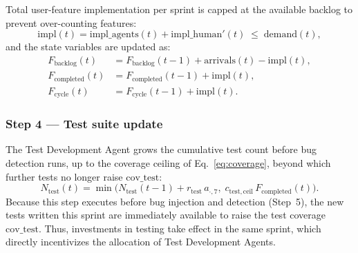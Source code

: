 \documentclass[smallextended]{svjour3}       %
\begin{document}
Total user-feature implementation per sprint is capped at the available backlog to
prevent over-counting features:
\begin{equation}
  \mathrm{impl}(t) = \mathrm{impl\_agents}(t) + \mathrm{impl\_human}'(t)
    \;\leq\; \mathrm{demand}(t),
  \label{eq:impl}
\end{equation}
and the state variables are updated as:
\begin{align}
  F_\mathrm{backlog}(t)   &= F_\mathrm{backlog}(t-1) + \mathrm{arrivals}(t) - \mathrm{impl}(t),
    \label{eq:backlog_update} \\
  F_\mathrm{completed}(t) &= F_\mathrm{completed}(t-1) + \mathrm{impl}(t),
    \label{eq:completed_update} \\
  F_\mathrm{cycle}(t) &= F_\mathrm{cycle}(t-1) + \mathrm{impl}(t).
    \label{eq:cycle_update}
\end{align}

\subsubsection*{Step 4 --- Test suite update}
The Test Development Agent grows the
cumulative test count before bug detection runs, up to the coverage ceiling of
Eq.~\eqref{eq:coverage}, beyond which further tests no longer raise
$\mathrm{cov\_test}$:
\begin{equation}
  N_\mathrm{test}(t) = \min\!\bigl(N_\mathrm{test}(t-1) + r_\mathrm{test}\,a_{\cdot,7},\;
    c_\mathrm{test,ceil}\,F_\mathrm{completed}(t)\bigr).
  \label{eq:ntest_update}
\end{equation}
Because this step executes before bug injection and detection (Step~5), the new
tests written this sprint are immediately available to raise the test coverage
$\mathrm{cov\_test}$. Thus, investments in testing take effect in the same sprint, which directly incentivizes the allocation of Test Development Agents.
\end{document}
